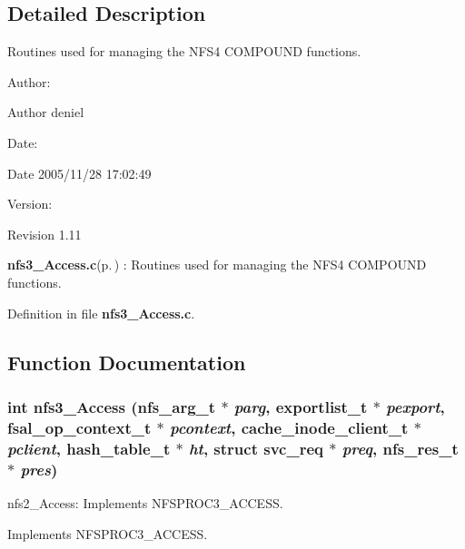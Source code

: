 \subsection{Detailed Description}
Routines used for managing the NFS4 COMPOUND functions. 

\begin{Desc}
\item[Author:]\begin{Desc}
\item[Author]deniel \end{Desc}
\end{Desc}
\begin{Desc}
\item[Date:]\begin{Desc}
\item[Date]2005/11/28 17:02:49 \end{Desc}
\end{Desc}
\begin{Desc}
\item[Version:]\begin{Desc}
\item[Revision]1.11 \end{Desc}
\end{Desc}
{\bf nfs3\_\-Access.c}{\rm (p.\,\pageref{nfs3__Access_8c})} : Routines used for managing the NFS4 COMPOUND functions.

Definition in file {\bf nfs3\_\-Access.c}.

\subsection{Function Documentation}
\subsubsection{\setlength{\rightskip}{0pt plus 5cm}int nfs3\_\-Access (nfs\_\-arg\_\-t $\ast$ {\em parg}, exportlist\_\-t $\ast$ {\em pexport}, fsal\_\-op\_\-context\_\-t $\ast$ {\em pcontext}, cache\_\-inode\_\-client\_\-t $\ast$ {\em pclient}, hash\_\-table\_\-t $\ast$ {\em ht}, struct svc\_\-req $\ast$ {\em preq}, nfs\_\-res\_\-t $\ast$ {\em pres})}\label{nfs3__Access_8c_a0}


nfs2\_\-Access: Implements NFSPROC3\_\-ACCESS.

Implements NFSPROC3\_\-ACCESS.

